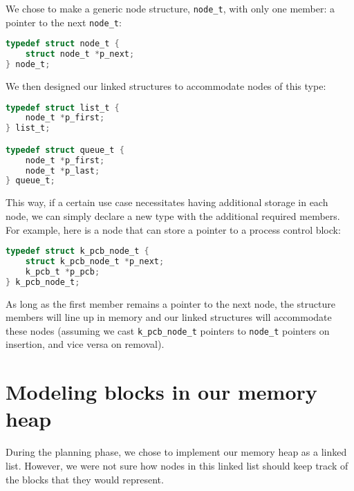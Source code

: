 \documentclass[12pt]{report}
\begin{document}
We chose to make a generic node structure, \texttt{node_t}, with only one member: a pointer to the next \texttt{node_t}:

\begin{minipage}{\textwidth}
\begin{lstlisting}[language=C]
typedef struct node_t {
    struct node_t *p_next;
} node_t;
\end{lstlisting}
\end{minipage}

We then designed our linked structures to accommodate nodes of this type:

\begin{minipage}{\textwidth}
\begin{lstlisting}[language=C]
typedef struct list_t {
    node_t *p_first;
} list_t;

typedef struct queue_t {
    node_t *p_first;
    node_t *p_last;
} queue_t;
\end{lstlisting}
\end{minipage}

This way, if a certain use case necessitates having additional storage in each node, we can simply declare a new type with the additional required members. For example, here is a node that can store a pointer to a process control block:

\begin{minipage}{\textwidth}
\begin{lstlisting}[language=C]
typedef struct k_pcb_node_t {
    struct k_pcb_node_t *p_next;
    k_pcb_t *p_pcb;
} k_pcb_node_t;
\end{lstlisting}
\end{minipage}

As long as the first member remains a pointer to the next node, the structure members will line up in memory and our linked structures will accommodate these nodes (assuming we cast \texttt{k_pcb_node_t} pointers to \texttt{node_t} pointers on insertion, and vice versa on removal).

\section{Modeling blocks in our memory heap}

During the planning phase, we chose to implement our memory heap as a linked list. However, we were not sure how nodes in this linked list should keep track of the blocks that they would represent.\\
\end{document}
